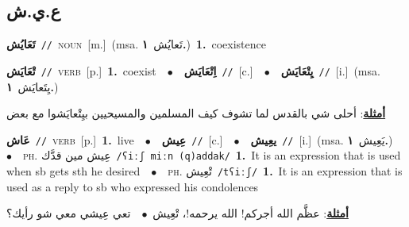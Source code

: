 \documentclass[10pt,a4paper,twoside]{article} %
\begin{document}
\begin{multicols}{2}
\vspace{-3mm}
\subsection*{\color{blue}\foreignlanguage{arabic}{ع.ي.ش}\color{blue}{}} 

{\setlength\topsep{0pt}\textbf{\foreignlanguage{arabic}{تَعَايُش}}\ {\color{gray}\texttt{//}\color{black}}\ \textsc{noun}\ [m.]\ \color{gray}(msa. \foreignlanguage{arabic}{تَعايُش}~\foreignlanguage{arabic}{\textbf{١.}})\color{black}\ \textbf{1.}~coexistence\ } \vspace{2mm}

{\setlength\topsep{0pt}\textbf{\foreignlanguage{arabic}{تْعَايَش}}\ {\color{gray}\texttt{//}\color{black}}\ \textsc{verb}\ [p.]\ \textbf{1.}~coexist\ \ $\bullet$\ \ \setlength\topsep{0pt}\textbf{\foreignlanguage{arabic}{اِتْعَايَش}}\ {\color{gray}\texttt{//}\color{black}}\ [c.]\ \ $\bullet$\ \ \setlength\topsep{0pt}\textbf{\foreignlanguage{arabic}{يِتْعَايَش}}\ {\color{gray}\texttt{//}\color{black}}\ [i.]\ \color{gray}(msa. \foreignlanguage{arabic}{يِتَعايَش}~\foreignlanguage{arabic}{\textbf{١.}})\color{black}\  \begin{flushright}\color{gray}\foreignlanguage{arabic}{\textbf{\underline{\foreignlanguage{arabic}{أمثلة}}}: أحلى شي بالقدس لما تشوف كيف المسلمين والمسيحيين بيِتْعايَشوا مع بعض}\end{flushright}\color{black}} \vspace{2mm}

{\setlength\topsep{0pt}\textbf{\foreignlanguage{arabic}{عَاش}}\ {\color{gray}\texttt{//}\color{black}}\ \textsc{verb}\ [p.]\ \textbf{1.}~live\ \ $\bullet$\ \ \setlength\topsep{0pt}\textbf{\foreignlanguage{arabic}{عِيش}}\ {\color{gray}\texttt{//}\color{black}}\ [c.]\ \ $\bullet$\ \ \setlength\topsep{0pt}\textbf{\foreignlanguage{arabic}{يعِيش}}\ {\color{gray}\texttt{//}\color{black}}\ [i.]\ \color{gray}(msa. \foreignlanguage{arabic}{يَعِيش}~\foreignlanguage{arabic}{\textbf{١.}})\color{black}\ \ $\bullet$\ \ \textsc{ph.} \color{gray} \foreignlanguage{arabic}{عِيش مين قدَّك}\color{black}\ {\color{gray}\texttt{/{\sffamily ʕiːʃ miːn (q)addak}/}\color{black}}\ \textbf{1.}~It is an expression that is used when sb gets sth he desired\ \ $\bullet$\ \ \textsc{ph.} \color{gray} \foreignlanguage{arabic}{تْعِيش}\color{black}\ {\color{gray}\texttt{/{\sffamily tʕiːʃ}/}\color{black}}\ \textbf{1.}~It is an expression that is used as a reply to sb who expressed his condolences\  \begin{flushright}\color{gray}\foreignlanguage{arabic}{\textbf{\underline{\foreignlanguage{arabic}{أمثلة}}}: عظَّم الله أجركم! الله يرحمه!، تْعِيش\ $\bullet$\ \  تعي عِيشي معي شو رأيك؟}\end{flushright}\color{black}} \vspace{2mm}


\end{multicols}
\end{document}
